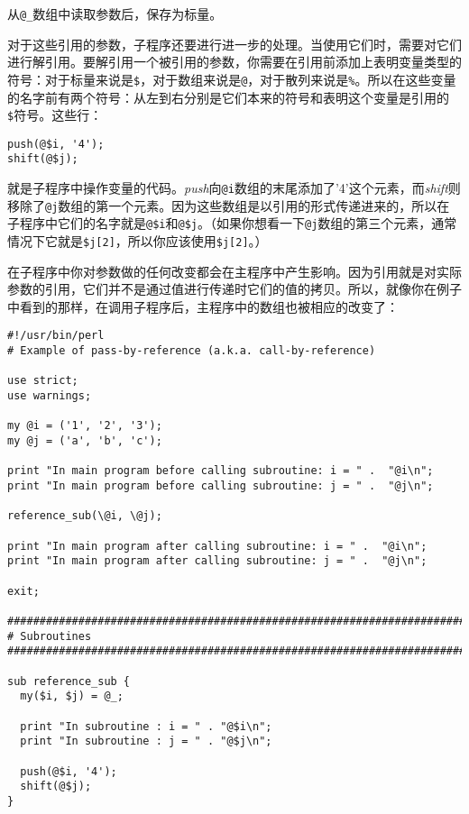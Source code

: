 从\verb|@_|数组中读取参数后，保存为标量。

对于这些引用的参数，子程序还要进行进一步的处理。当使用它们时，需要对它们进行解引用。要解引用一个被引用的参数，你需要在引用前添加上表明变量类型的符号：对于标量来说是\verb|$|，对于数组来说是\verb|@|，对于散列来说是\verb|%|。所以在这些变量的名字前有两个符号：从左到右分别是它们本来的符号和表明这个变量是引用的\verb|$|符号。这些行：

\begin{lstlisting}
push(@$i, '4');
shift(@$j);
\end{lstlisting}

就是子程序中操作变量的代码。\textit{push}向\verb|@i|数组的末尾添加了'4'这个元素，而\textit{shift}则移除了\verb|@j|数组的第一个元素。因为这些数组是以引用的形式传递进来的，所以在子程序中它们的名字就是\verb|@$i|和\verb|@$j|。（如果你想看一下\verb|@j|数组的第三个元素，通常情况下它就是\verb|$j[2]|，所以你应该使用\verb|$j[2]|。）

在子程序中你对参数做的任何改变都会在主程序中产生影响。因为引用就是对实际参数的引用，它们并不是通过值进行传递时它们的值的拷贝。所以，就像你在例子中看到的那样，在调用子程序后，主程序中的数组也被相应的改变了：

\begin{lstlisting}
#!/usr/bin/perl
# Example of pass-by-reference (a.k.a. call-by-reference)

use strict;
use warnings;

my @i = ('1', '2', '3');
my @j = ('a', 'b', 'c');

print "In main program before calling subroutine: i = " .  "@i\n";
print "In main program before calling subroutine: j = " .  "@j\n";

reference_sub(\@i, \@j);

print "In main program after calling subroutine: i = " .  "@i\n";
print "In main program after calling subroutine: j = " .  "@j\n";

exit;

################################################################################
# Subroutines
################################################################################

sub reference_sub {
  my($i, $j) = @_;

  print "In subroutine : i = " . "@$i\n";
  print "In subroutine : j = " . "@$j\n";

  push(@$i, '4');
  shift(@$j);
}
\end{lstlisting}

